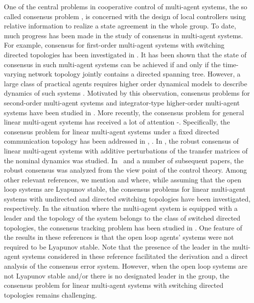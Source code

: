\documentclass[letterpaper, 10 pt, conference]{ieeeconf}
\begin{document}
One of the central problems in cooperative control of multi-agent systems,
the so called consensus problem \cite{Jadbabaie2003TAC,SaberMurrayTAC2005},
is concerned with the design of local controllers using relative information
to realize a state agreement in the whole group. To date, much progress has
been made in the study of consensus in multi-agent systems. For example,
consensus for first-order multi-agent systems with switching directed
topologies has been investigated in
\cite{RenBeard2005TAC,Moreau2005TAC}. It has
been shown that the state of consensus in such multi-agent systems can
be achieved if and only if the time-varying network topology jointly
contains a directed spanning tree. However, a large class of practical
agents requires higher order dynamical models to describe dynamics of such
systems \cite{RenJIRS2007}. Motivated by this observation, consensus
problems for second-order multi-agent systems and integrator-type
higher-order multi-agent systems have been studied in
\cite{RenAtkinsRNC2007,WenDuanYuChenRNC2012,WielandKimFrankIJSS2011}. More recently, the consensus problem for general linear multi-agent systems has
received a lot of  attention
 \cite{LiDuanChenHuangTCASI2010}-\cite{WenDuanRenChenRNC}. Specifically,
the consensus problem for linear multi-agent systems under a fixed directed
 communication topology has been addressed in
 \cite{LiDuanChenHuangTCASI2010}, \cite{ZhangFrankDas2011TAC}. In
 \cite{TrentelmanTakabaMonshizadehIEEETAC2013}, the robust consensus of linear
 multi-agent systems with additive perturbations of the transfer matrices
 of the nominal dynamics was studied. In~\cite{Ugrinovskii2011Automatica}
 and a number of subsequent papers, the robust consensus  was analyzed from
 the view point of the  control theory.
Among other relevant references, we mention \cite{SuHuangTAC2012} and
\cite{WuQinYuAllgowerCDC2013} where, while assuming that the open loop
systems are Lyapunov stable, the consensus problems for linear multi-agent
systems with undirected and directed switching topologies have been
investigated, respectively. In the situation where the multi-agent
system is equipped with a leader and the topology of the system
belongs to the class of switched directed topologies, the consensus
tracking problem has been studied in
\cite{WenHuYuChenCaoSCL2013,WenDuanRenChenRNC}. One  feature of the results in these references
 is that the open loop agents' systems were not
required to be Lyapunov stable. Note that the presence of the leader in
the multi-agent systems considered in these reference facilitated the
derivation and a direct
analysis of the consensus error system. However, when the open loop systems are
not Lyapunov stable and/or there is no designated leader in the group, the
consensus problem for linear multi-agent systems with switching directed
topologies remains challenging.
\end{document}
